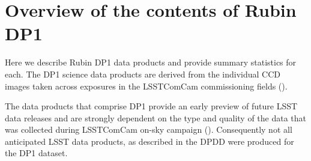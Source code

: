 \section{Overview of the contents of Rubin DP1
\label{sec:data_products}}

Here we describe Rubin \gls{DP1} data products and provide summary statistics for each.
The \gls{DP1} science data products are derived from the \nvisitimages individual \gls{CCD} images taken across \nexposures exposures in the \nfields \gls{LSSTComCam} commissioning fields ().

The data products that comprise \gls{DP1} provide an early preview of future LSST data releases and are strongly dependent on the type and quality of the data that was collected during \gls{LSSTComCam} on-sky campaign ().
Consequently not all anticipated  LSST data products, as described in the \gls{DPDD} \citep{LSE-163} were produced for the \gls{DP1} dataset.


